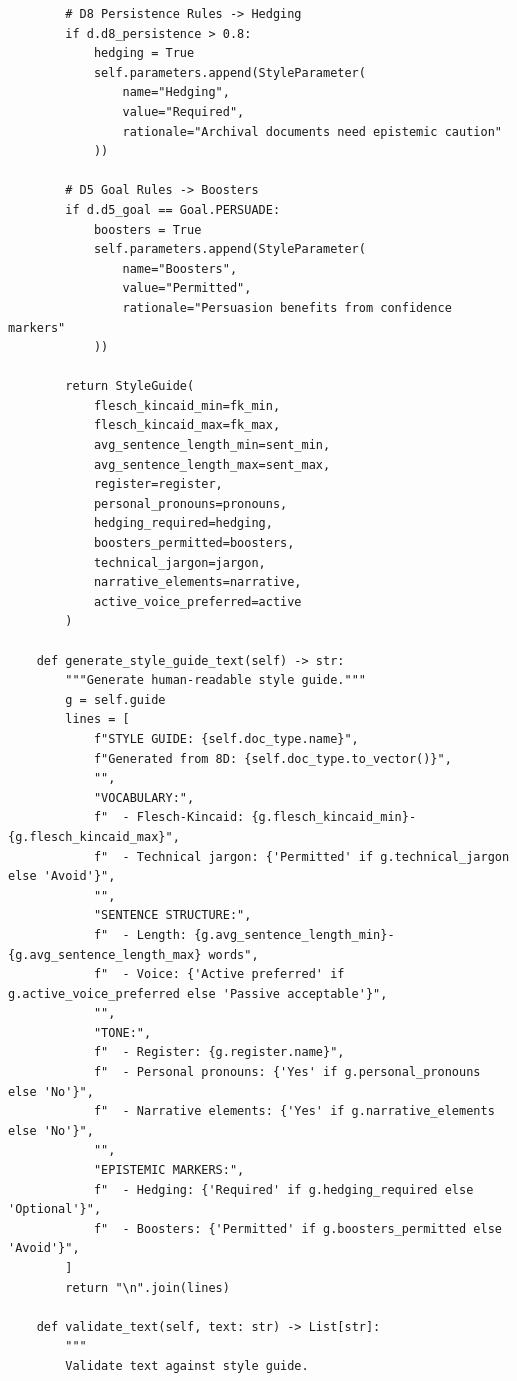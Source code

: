 \begin{verbatim}
        # D8 Persistence Rules -> Hedging
        if d.d8_persistence > 0.8:
            hedging = True
            self.parameters.append(StyleParameter(
                name="Hedging",
                value="Required",
                rationale="Archival documents need epistemic caution"
            ))

        # D5 Goal Rules -> Boosters
        if d.d5_goal == Goal.PERSUADE:
            boosters = True
            self.parameters.append(StyleParameter(
                name="Boosters",
                value="Permitted",
                rationale="Persuasion benefits from confidence markers"
            ))

        return StyleGuide(
            flesch_kincaid_min=fk_min,
            flesch_kincaid_max=fk_max,
            avg_sentence_length_min=sent_min,
            avg_sentence_length_max=sent_max,
            register=register,
            personal_pronouns=pronouns,
            hedging_required=hedging,
            boosters_permitted=boosters,
            technical_jargon=jargon,
            narrative_elements=narrative,
            active_voice_preferred=active
        )

    def generate_style_guide_text(self) -> str:
        """Generate human-readable style guide."""
        g = self.guide
        lines = [
            f"STYLE GUIDE: {self.doc_type.name}",
            f"Generated from 8D: {self.doc_type.to_vector()}",
            "",
            "VOCABULARY:",
            f"  - Flesch-Kincaid: {g.flesch_kincaid_min}-{g.flesch_kincaid_max}",
            f"  - Technical jargon: {'Permitted' if g.technical_jargon else 'Avoid'}",
            "",
            "SENTENCE STRUCTURE:",
            f"  - Length: {g.avg_sentence_length_min}-{g.avg_sentence_length_max} words",
            f"  - Voice: {'Active preferred' if g.active_voice_preferred else 'Passive acceptable'}",
            "",
            "TONE:",
            f"  - Register: {g.register.name}",
            f"  - Personal pronouns: {'Yes' if g.personal_pronouns else 'No'}",
            f"  - Narrative elements: {'Yes' if g.narrative_elements else 'No'}",
            "",
            "EPISTEMIC MARKERS:",
            f"  - Hedging: {'Required' if g.hedging_required else 'Optional'}",
            f"  - Boosters: {'Permitted' if g.boosters_permitted else 'Avoid'}",
        ]
        return "\n".join(lines)

    def validate_text(self, text: str) -> List[str]:
        """
        Validate text against style guide.


\end{verbatim}
